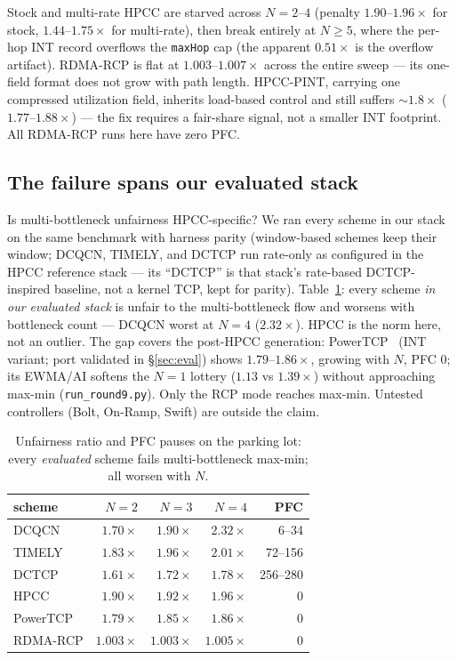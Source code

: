 \documentclass[sigconf, nonacm]{acmart}
\newcommand{\hpccfs}{\textsc{RDMA-RCP}\xspace}
\begin{document}
Stock and multi-rate HPCC are starved across $N = 2$--$4$ (penalty $1.90$--$1.96\times$ for stock,
$1.44$--$1.75\times$ for multi-rate), then break entirely at $N \ge 5$, where the per-hop INT
record overflows the \texttt{maxHop} cap (the apparent $0.51\times$ is the overflow
artifact). \hpccfs is flat at $1.003$--$1.007\times$ across the entire sweep --- its one-field format
does not grow with path length. HPCC-PINT, carrying one compressed utilization field, inherits load-based control and still
suffers ${\sim}1.8\times$ ($1.77$--$1.88\times$) --- the fix requires a fair-share signal,
not a smaller INT footprint. All \hpccfs runs here have zero PFC.

\subsection{The failure spans our evaluated stack}
\label{sec:endemic}

Is multi-bottleneck unfairness HPCC-specific? We ran every scheme in our stack on the same
benchmark with harness parity (window-based schemes keep their window; DCQCN, TIMELY, and
DCTCP run rate-only as configured in the HPCC reference stack --- its ``DCTCP'' is that
stack's rate-based DCTCP-inspired baseline, not a kernel TCP, kept for parity). Table~\ref{tab:endemic}: every scheme \emph{in our evaluated stack} is unfair to the
multi-bottleneck flow and worsens with bottleneck count --- DCQCN worst at $N{=}4$
($2.32\times$). HPCC is the norm here, not an outlier. The gap covers the post-HPCC generation:
PowerTCP~\cite{addanki2022powertcp} (INT variant; port validated in \S\ref{sec:eval})
shows $1.79$--$1.86\times$, growing with $N$, PFC 0; its EWMA/AI softens the $N{=}1$
lottery ($1.13$ vs $1.39\times$) without approaching max-min (\texttt{run\_round9.py}). Only the RCP mode reaches max-min. Untested controllers (Bolt,
On-Ramp, Swift) are outside the claim.

\begin{table}[t]
\caption{Unfairness ratio and PFC pauses on the parking lot: every \emph{evaluated} scheme
fails multi-bottleneck max-min; all worsen with $N$.}
\label{tab:endemic}
\centering\small
\begin{tabular}{lrrrr}
\toprule
scheme & $N{=}2$ & $N{=}3$ & $N{=}4$ & PFC \\
\midrule
DCQCN & $1.70\times$ & $1.90\times$ & $2.32\times$ & 6--34 \\
TIMELY & $1.83\times$ & $1.96\times$ & $2.01\times$ & 72--156 \\
DCTCP & $1.61\times$ & $1.72\times$ & $1.78\times$ & 256--280 \\
HPCC & $1.90\times$ & $1.92\times$ & $1.96\times$ & 0 \\
PowerTCP & $1.79\times$ & $1.85\times$ & $1.86\times$ & 0 \\
\hpccfs & $\mathbf{1.003\times}$ & $\mathbf{1.003\times}$ & $\mathbf{1.005\times}$ & 0 \\
\bottomrule
\end{tabular}
\end{table}
\end{document}
